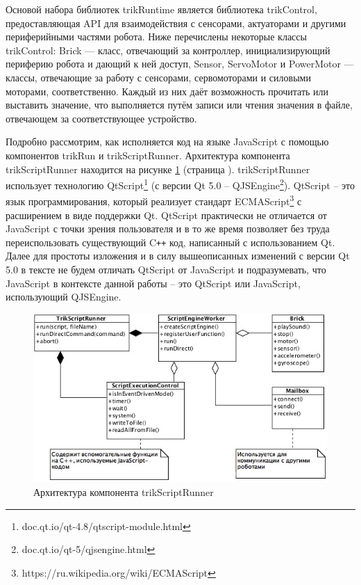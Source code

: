 \documentclass[14pt]{matmex-diploma-custom}
\begin{document}
Основой набора библиотек trikRuntime является библиотека trikControl, предоставляющая API для взаимодействия с сенсорами, актуаторами и другими периферийными частями робота. Ниже перечислены некоторые классы trikControl: Brick — класс, отвечающий за контроллер, инициализирующий периферию робота и дающий к ней доступ, Sensor, ServoMotor и PowerMotor — классы, отвечающие за работу с сенсорами, сервомоторами и силовыми моторами, соответственно. Каждый из них даёт возможность прочитать или выставить значение, что выполняется путём записи или чтения значения в файле, отвечающем за соответствующее устройство.


Подробно рассмотрим, как исполняется код на языке JavaScript с помощью компонентов trikRun и trikScriptRunner. Архитектура компонента trikScriptRunner находится на рисунке \ref{trikScriptRunner} (страница \pageref{trikScriptRunner}). trikScriptRunner использует технологию QtScript\footnote{doc.qt.io/qt-4.8/qtscript-module.html} (с версии Qt 5.0 -- QJSEngine\footnote{doc.qt.io/qt-5/qjsengine.html}). QtScript -- это язык программирования, который реализует стандарт ECMAScript\footnote{https://ru.wikipedia.org/wiki/ECMAScript} с расширением в виде поддержки Qt. QtScript практически не отличается от JavaScript с точки зрения пользователя и в то же время позволяет без труда переиспользовать существующий C\texttt{++} код, написанный с использованием Qt. Далее для простоты изложения и в силу вышеописанных изменений с версии Qt 5.0 в тексте не будем отличать QtScript от JavaScript и подразумевать, что JavaScript в контексте данной работы -- это QtScript или JavaScript, использующий QJSEngine.

\begin{figure}[h]
	\includegraphics[width=\textwidth]{images/trikScriptRunner.jpg}
	\caption{Архитектура компонента trikScriptRunner}
	\label{trikScriptRunner}
\end{figure}
\end{document}
